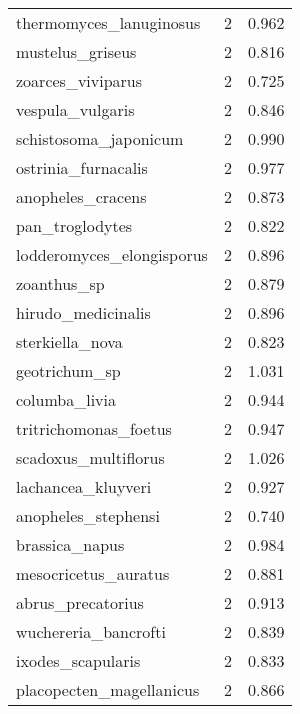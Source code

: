 \begin{tabular}{lrr}
        thermomyces\_lanuginosus &                   2 &     0.962 \\
               mustelus\_griseus &                   2 &     0.816 \\
              zoarces\_viviparus &                   2 &     0.725 \\
               vespula\_vulgaris &                   2 &     0.846 \\
          schistosoma\_japonicum &                   2 &     0.990 \\
            ostrinia\_furnacalis &                   2 &     0.977 \\
              anopheles\_cracens &                   2 &     0.873 \\
                pan\_troglodytes &                   2 &     0.822 \\
      lodderomyces\_elongisporus &                   2 &     0.896 \\
                    zoanthus\_sp &                   2 &     0.879 \\
             hirudo\_medicinalis &                   2 &     0.896 \\
                sterkiella\_nova &                   2 &     0.823 \\
                  geotrichum\_sp &                   2 &     1.031 \\
                  columba\_livia &                   2 &     0.944 \\
          tritrichomonas\_foetus &                   2 &     0.947 \\
           scadoxus\_multiflorus &                   2 &     1.026 \\
             lachancea\_kluyveri &                   2 &     0.927 \\
            anopheles\_stephensi &                   2 &     0.740 \\
                 brassica\_napus &                   2 &     0.984 \\
           mesocricetus\_auratus &                   2 &     0.881 \\
              abrus\_precatorius &                   2 &     0.913 \\
           wuchereria\_bancrofti &                   2 &     0.839 \\
              ixodes\_scapularis &                   2 &     0.833 \\
       placopecten\_magellanicus &                   2 &     0.866 \\

\end{tabular}
